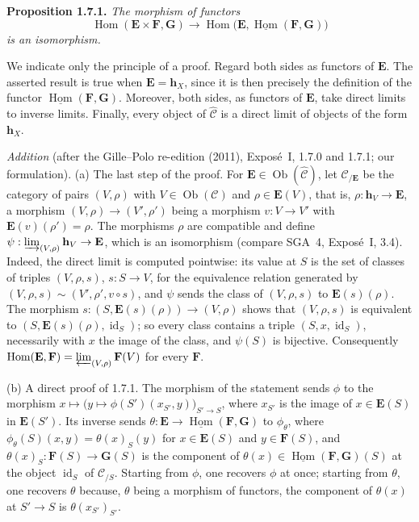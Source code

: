 \medskip
\noindent{}\textbf{Proposition 1.7.1.}
\textit{The morphism of functors
\[
  \operatorname{Hom}(\mathbf E\times\mathbf F,\mathbf G)
    \longrightarrow
  \operatorname{Hom}
    \bigl(\mathbf E,
      \underline{\operatorname{Hom}}(\mathbf F,\mathbf G)\bigr)
\]
is an isomorphism.}

We indicate only the principle of a proof. Regard both sides as functors
of \(\mathbf E\). The asserted result is true when \(\mathbf E=\mathbf h_X\),
since it is then precisely the definition of the functor
\(\underline{\operatorname{Hom}}(\mathbf F,\mathbf G)\). Moreover, both
sides, as functors of \(\mathbf E\), take direct limits to inverse limits.
Finally, every object of \(\widehat{\mathscr C}\) is a direct limit of
objects of the form \(\mathbf h_X\).

\par\medskip\noindent
\emph{Addition} (after the Gille--Polo re-edition (2011), Exposé~I, 1.7.0
and 1.7.1; our formulation). (a) The last step of the proof. For
\(\mathbf E\in\operatorname{Ob}(\widehat{\mathscr C})\), let
\(\mathscr C_{/\mathbf E}\) be the category of pairs \((V,\rho)\) with
\(V\in\operatorname{Ob}(\mathscr C)\) and \(\rho\in\mathbf E(V)\), that is,
\(\rho:\mathbf h_V\to\mathbf E\), a morphism \((V,\rho)\to(V',\rho')\) being
a morphism \(v:V\to V'\) with \(\mathbf E(v)(\rho')=\rho\). The morphisms
\(\rho\) are compatible and define
\(\psi:\varinjlim_{(V,\rho)}\mathbf h_V\to\mathbf E\), which is an
isomorphism (compare SGA~4, Exposé~I, 3.4). Indeed, the direct limit is
computed pointwise: its value at \(S\) is the set of classes of triples
\((V,\rho,s)\), \(s:S\to V\), for the equivalence relation generated by
\((V,\rho,s)\sim(V',\rho',v\circ s)\), and \(\psi\) sends the class of
\((V,\rho,s)\) to \(\mathbf E(s)(\rho)\). The morphism
\(s:(S,\mathbf E(s)(\rho))\to(V,\rho)\) shows that \((V,\rho,s)\) is
equivalent to \((S,\mathbf E(s)(\rho),\operatorname{id}_S)\); so every class
contains a triple \((S,x,\operatorname{id}_S)\), necessarily with \(x\) the
image of the class, and \(\psi(S)\) is bijective. Consequently
\(\operatorname{Hom}(\mathbf E,\mathbf F)=\varprojlim_{(V,\rho)}\mathbf F(V)\)
for every \(\mathbf F\).

(b) A direct proof of 1.7.1. The morphism of the statement sends \(\phi\)
to the morphism \(x\mapsto\bigl(y\mapsto\phi(S')(x_{S'},y)\bigr)_{S'\to S}\),
where \(x_{S'}\) is the image of \(x\in\mathbf E(S)\) in
\(\mathbf E(S')\). Its inverse sends
\(\theta:\mathbf E\to\underline{\operatorname{Hom}}(\mathbf F,\mathbf G)\)
to \(\phi_\theta\), where \(\phi_\theta(S)(x,y)=\theta(x)_S(y)\) for
\(x\in\mathbf E(S)\) and \(y\in\mathbf F(S)\), and
\(\theta(x)_S:\mathbf F(S)\to\mathbf G(S)\) is the component of
\(\theta(x)\in\underline{\operatorname{Hom}}(\mathbf F,\mathbf G)(S)\) at the
object \(\operatorname{id}_S\) of \(\mathscr C_{/S}\). Starting from
\(\phi\), one recovers \(\phi\) at once; starting from \(\theta\), one
recovers \(\theta\) because, \(\theta\) being a morphism of functors, the
component of \(\theta(x)\) at \(S'\to S\) is \(\theta(x_{S'})_{S'}\).

